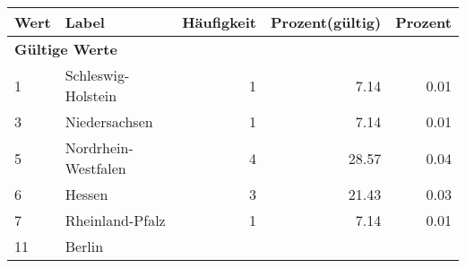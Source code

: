      \begin{longtable}{lXrrr}
     \toprule
     \textbf{Wert} & \textbf{Label} & \textbf{Häufigkeit} & \textbf{Prozent(gültig)} & \textbf{Prozent} \\
     \endhead
     \midrule
     \multicolumn{5}{l}{\textbf{Gültige Werte}}\\

     1 &
     \multicolumn{1}{X}{ Schleswig-Holstein   } &


       \num{1} &
       \num[round-mode=places,round-precision=2]{7.14} &
         \num[round-mode=places,round-precision=2]{0.01} \\

     3 &
     \multicolumn{1}{X}{ Niedersachsen   } &


       \num{1} &
       \num[round-mode=places,round-precision=2]{7.14} &
         \num[round-mode=places,round-precision=2]{0.01} \\

     5 &
     \multicolumn{1}{X}{ Nordrhein-Westfalen   } &


       \num{4} &
       \num[round-mode=places,round-precision=2]{28.57} &
         \num[round-mode=places,round-precision=2]{0.04} \\

     6 &
     \multicolumn{1}{X}{ Hessen   } &


       \num{3} &
       \num[round-mode=places,round-precision=2]{21.43} &
         \num[round-mode=places,round-precision=2]{0.03} \\

     7 &
     \multicolumn{1}{X}{ Rheinland-Pfalz   } &


       \num{1} &
       \num[round-mode=places,round-precision=2]{7.14} &
         \num[round-mode=places,round-precision=2]{0.01} \\

     11 &
     \multicolumn{1}{X}{ Berlin   } &



\end{longtable}
